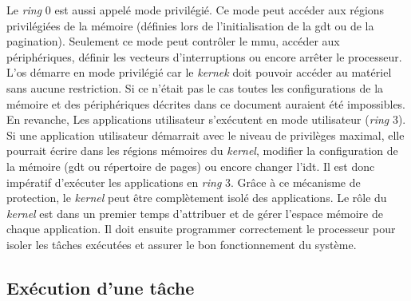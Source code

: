 Le \textit{ring} 0 est aussi appelé mode privilégié. Ce mode peut accéder aux régions
privilégiées de la mémoire (définies lors de l'initialisation de la \acrshort{gdt}
ou de la pagination). Seulement ce mode peut contrôler le \acrshort{mmu}, accéder
aux périphériques, définir les vecteurs d'interruptions ou encore arrêter le
processeur. L'\acrshort{os} démarre en mode privilégié car le \textit{kernek} doit
pouvoir accéder au matériel sans aucune restriction. Si ce n'était pas le cas toutes
les configurations de la mémoire et des périphériques décrites dans ce document
auraient été impossibles. En revanche, Les applications utilisateur s'exécutent
en mode utilisateur (\textit{ring} 3). Si une application utilisateur démarrait
avec le niveau de privilèges maximal, elle pourrait écrire dans les régions mémoires
du \textit{kernel}, modifier la configuration de la mémoire (\acrshort{gdt} ou 
répertoire de pages) ou encore changer l'\acrshort{idt}. Il est donc impératif
d'exécuter les applications en \textit{ring} 3. Grâce à ce mécanisme de protection,
le \textit{kernel} peut être complètement isolé des applications. Le rôle du \textit{kernel}
est dans un premier temps d'attribuer et de gérer l'espace mémoire de chaque application.
Il doit ensuite programmer correctement le processeur pour isoler les tâches exécutées
et assurer le bon fonctionnement du système.


\subsection{Exécution d'une tâche}
